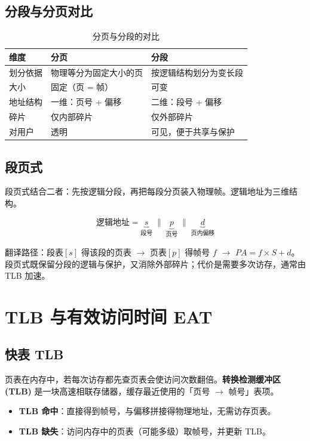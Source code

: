 \subsection{分段与分页对比}

\begin{table}[H]
\centering
\caption{分页与分段的对比}
\begin{tabulary}{\textwidth}{LLL}
\toprule
维度 & 分页 & 分段 \\
\midrule
划分依据 & 物理等分为固定大小的页 & 按逻辑结构划分为变长段 \\
大小 & 固定（页 = 帧） & 可变 \\
地址结构 & 一维：页号 + 偏移 & 二维：段号 + 偏移 \\
碎片 & 仅内部碎片 & 仅外部碎片 \\
对用户 & 透明 & 可见，便于共享与保护 \\
\bottomrule
\end{tabulary}
\end{table}

\subsection{段页式}

段页式结合二者：先按逻辑分段，再把每段分页装入物理帧。逻辑地址为三维结构。

\begin{equation}
    \text{逻辑地址} = \underbrace{s}_{\text{段号}} \;\|\; \underbrace{p}_{\text{页号}} \;\|\; \underbrace{d}_{\text{页内偏移}}
\end{equation}

翻译路径：段表$[s]$ 得该段的页表 $\to$ 页表$[p]$ 得帧号 $f$ $\to$ $PA = f \times S + d$。段页式既保留分段的逻辑与保护，又消除外部碎片；代价是需要多次访存，通常由 TLB 加速。

\section{TLB 与有效访问时间 EAT}

\subsection{快表 TLB}

页表在内存中，若每次访存都先查页表会使访问次数翻倍。\textbf{转换检测缓冲区 (TLB)} 是一块高速相联存储器，缓存最近使用的「页号 $\to$ 帧号」表项。

\begin{itemize}
    \item \textbf{TLB 命中}：直接得到帧号，与偏移拼接得物理地址，无需访存页表。
    \item \textbf{TLB 缺失}：访问内存中的页表（可能多级）取帧号，并更新 TLB。
\end{itemize}

